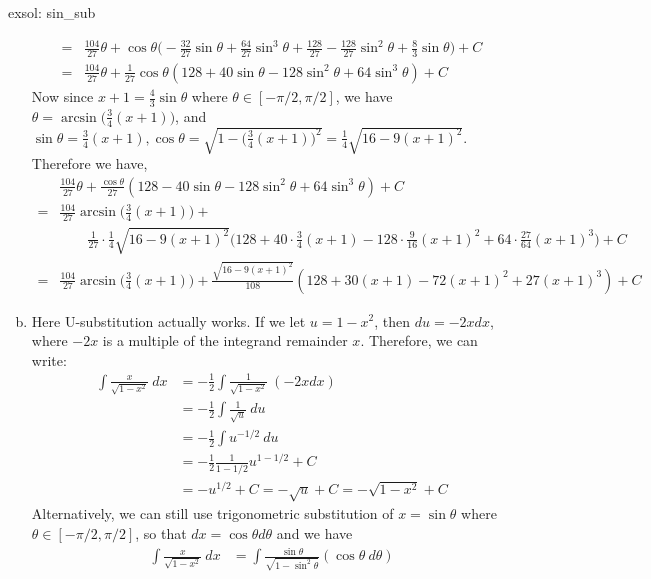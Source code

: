 \begin{exsol}[]{exsol: sin_sub}
\begin{enumerate}[a)]
\begin{align*}
            =&\frac{104}{27}\theta + \cos \theta\Big( -\frac{32}{27} \sin \theta + \frac{64}{27} \sin^3 \theta + \frac{128}{27} - \frac{128}{27} \sin^2 \theta + \frac{8}{3} \sin \theta \Big) + C\\
            =&\frac{104}{27}\theta + \frac{1}{27} \cos \theta(128+40\sin\theta -128\sin^2\theta + 64\sin^3\theta) +C
        \end{align*}
        Now since $x+1 = \frac{4}{3} \sin \theta$ where $\theta \in [-\pi/2, \pi/2]$, we have $\theta = \arcsin \big(\frac{3}{4}(x + 1)\big)$, and $\sin \theta = \frac{3}{4}(x + 1), \cos \theta = \sqrt{1-\big(\frac{3}{4}(x + 1)\big)^2} = \frac{1}{4}\sqrt{16-9(x+1)^2}$.  Therefore we have,
        \begin{align*}
            &\frac{104}{27}\theta + \frac{\cos\theta}{27}(128-40\sin\theta -128\sin^2\theta + 64\sin^3\theta) +C\\
            =&\frac{104}{27}\arcsin \Big(\frac{3}{4}(x + 1)\Big) +\\
            &\qquad\frac{1}{27} \cdot \frac{1}{4} \sqrt{16-9(x+1)^2}\Big(128+40\cdot\frac{3}{4}(x+1) -128\cdot\frac{9}{16}(x+1)^2 + 64\cdot\frac{27}{64}(x+1)^3\Big) +C\\
            =&\frac{104}{27}\arcsin \Big(\frac{3}{4}(x + 1)\Big) + \frac{\sqrt{16-9(x+1)^2}}{108}(128+30(x+1)-72(x+1)^2+27(x+1)^3) + C
        \end{align*}
        \item Here U-substitution actually works.  If we let $u = 1-x^2$, then $du = -2xdx$, where $-2x$ is a multiple of the integrand remainder $x$.  Therefore, we can write:
        \begin{align*}
            \int \frac{x}{\sqrt{1-x^2}}~dx &= -\frac{1}{2}\int \frac{1}{\sqrt{1-x^2}}~(-2xdx)\\
            &= -\frac{1}{2}\int \frac{1}{\sqrt{u}}~du\\
            &= -\frac{1}{2}\int u^{-1/2}~du\\
            &= -\frac{1}{2}\frac{1}{1-1/2}u^{1-1/2}+C\\
            &= -u^{1/2} + C = -\sqrt{u} + C = -\sqrt{1-x^2} + C
        \end{align*}
        Alternatively, we can still use trigonometric substitution of $x = \sin \theta$ where $\theta \in [-\pi/2, \pi/2]$, so that $dx = \cos \theta d\theta$ and we have
        \begin{align*}
            \int \frac{x}{\sqrt{1-x^2}}~dx &= \int \frac{\sin \theta}{\sqrt{1-\sin^2\theta}}(\cos \theta~d\theta)\\

\end{align*}
\end{enumerate}
\end{exsol}
